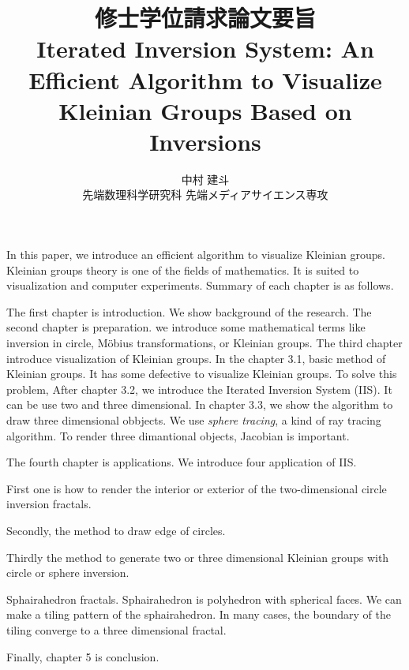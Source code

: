 \documentclass[uplatex, dvipdfmx]{article}
\title{修士学位請求論文要旨\\
 Iterated Inversion System: An Efficient Algorithm to Visualize Kleinian Groups Based on Inversions }
\author{中村 建斗\\
先端数理科学研究科 先端メディアサイエンス専攻\\
}
\date{}
\begin{document}
\maketitle
\pagestyle{plain}
\newpage

In this paper, we introduce an efficient algorithm to visualize Kleinian
groups.
Kleinian groups theory is one of the fields of mathematics.
It is suited to visualization and computer experiments.
Summary of each chapter is as follows.

The first chapter is introduction. 
We show background of the research.
The second chapter is preparation.
we introduce some mathematical terms like inversion in circle, 
M\"obius transformations, or Kleinian groups.
The third chapter introduce visualization of Kleinian groups.
In the chapter 3.1, basic method of Kleinian groups.
It has some defective to visualize Kleinian groups.
To solve this problem,
After chapter 3.2, we introduce the Iterated Inversion System (IIS).
It can be use two and three dimensional.
In chapter 3.3, we show the algorithm to draw three dimensional
obbjects.
We use \textit{sphere tracing}, a kind of ray tracing algorithm.
To render three dimantional objects, Jacobian is important.

The fourth chapter is applications.
We introduce four application of IIS.

First one is how to render the interior or exterior of the
two-dimensional circle inversion fractals.

Secondly, the method to draw edge of circles.

Thirdly
the method to generate two or three dimensional Kleinian groups with
circle or sphere inversion.

Sphairahedron fractals. Sphairahedron is polyhedron with spherical
faces. We can make a tiling pattern of the sphairahedron.
In many cases, the boundary of the tiling converge to a three
dimensional fractal. 


Finally, chapter 5 is conclusion.
\end{document}
